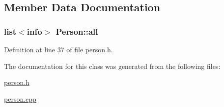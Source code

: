 \subsection{Member Data Documentation}
\hypertarget{class_person_a23d6ff8cb8e45c9e3502baffa6a0468a}{
\subsubsection[{all}]{\setlength{\rightskip}{0pt plus 5cm}list$<${\bf info}$>$ Person\+::all\hspace{0.3cm}{\ttfamily [private]}}}\label{class_person_a23d6ff8cb8e45c9e3502baffa6a0468a}


Definition at line 37 of file person.\+h.



The documentation for this class was generated from the following files\+:\begin{DoxyCompactItemize}
\item 
\hyperlink{person_8h}{person.\+h}\item 
\hyperlink{person_8cpp}{person.\+cpp}\end{DoxyCompactItemize}

